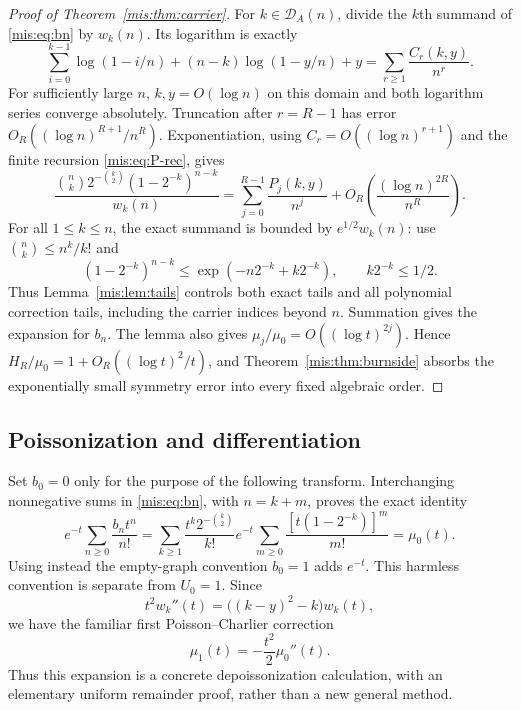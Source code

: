 \documentclass[11pt]{article}
\theoremstyle{remark}\newtheorem{remark}[theorem]{Remark}
\newcommand{\calD}{\mathcal D}
\begin{document}
\begin{proof}[Proof of Theorem~\ref{mis:thm:carrier}]
For $k\in\calD_A(n)$, divide the $k$th summand of \eqref{mis:eq:bn} by $w_k(n)$. Its logarithm is exactly
\begin{equation}\label{mis:eq:logexpand}
 \sum_{i=0}^{k-1}\log(1-i/n)+(n-k)\log(1-y/n)+y
       =\sum_{r\ge1}\frac{C_r(k,y)}{n^r}.
\end{equation}
For sufficiently large $n$, $k,y=O(\log n)$ on this domain and both logarithm series converge absolutely. Truncation after $r=R-1$ has error
$O_R((\log n)^{R+1}/n^R)$. Exponentiation, using $C_r=O((\log n)^{r+1})$ and the finite recursion \eqref{mis:eq:P-rec}, gives
\[
 \frac{\binom nk2^{-\binom k2}(1-2^{-k})^{n-k}}{w_k(n)}
 =\sum_{j=0}^{R-1}\frac{P_j(k,y)}{n^j}
  +O_R\left(\frac{(\log n)^{2R}}{n^R}\right).
\]
For all $1\le k\le n$, the exact summand is bounded by $e^{1/2}w_k(n)$: use $\binom nk\le n^k/k!$ and
\[
 (1-2^{-k})^{n-k}\le\exp(-n2^{-k}+k2^{-k}),\qquad k2^{-k}\le1/2.
\]
Thus Lemma~\ref{mis:lem:tails} controls both exact tails and all polynomial correction tails, including the carrier indices beyond $n$. Summation gives the expansion for $b_n$. The lemma also gives $\mu_j/\mu_0=O((\log t)^{2j})$. Hence $H_R/\mu_0=1+O_R((\log t)^2/t)$, and Theorem~\ref{mis:thm:burnside} absorbs the exponentially small symmetry error into every fixed algebraic order.
\end{proof}

\subsection{Poissonization and differentiation}
Set $b_0=0$ only for the purpose of the following transform. Interchanging nonnegative sums in \eqref{mis:eq:bn}, with $n=k+m$, proves the exact identity
\begin{equation}\label{mis:eq:poisson}
 e^{-t}\sum_{n\ge0}\frac{b_n t^n}{n!}
 =\sum_{k\ge1}\frac{t^k2^{-\binom k2}}{k!}
       e^{-t}\sum_{m\ge0}\frac{[t(1-2^{-k})]^m}{m!}
 =\mu_0(t).
\end{equation}
Using instead the empty-graph convention $b_0=1$ adds $e^{-t}$. This harmless convention is separate from $U_0=1$.
Since
\[
 t^2w_k''(t)=\bigl((k-y)^2-k\bigr)w_k(t),
\]
we have the familiar first Poisson--Charlier correction
\begin{equation}\label{mis:eq:charlier}
 \mu_1(t)=-\frac{t^2}{2}\mu_0''(t).
\end{equation}
Thus this expansion is a concrete depoissonization calculation, with an elementary uniform remainder proof, rather than a new general method.
\end{document}
